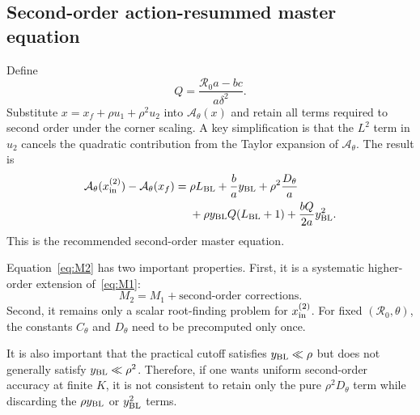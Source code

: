 \documentclass[11pt,a4paper]{article}
\newcommand{\Rzero}{\mathcal R_0}
\newcommand{\Afun}{\mathcal A_\theta}
\newcommand{\BL}{y_{\rm BL}}
\newcommand{\xf}{x_f}
\begin{document}
\subsection{Second-order action-resummed master equation}
Define
\begin{equation}
\label{eq:Q}
Q=\frac{\Rzero a-bc}{a\delta^2}.
\end{equation}
Substitute $x=\xf+\rho u_1+\rho^2u_2$ into $\Afun(x)$ and retain all terms required to second order under the corner scaling. A key simplification is that the $L^2$ term in $u_2$ cancels the quadratic contribution from the Taylor expansion of $\Afun$. The result is
\begin{equation}
\label{eq:M2}
\begin{split}
\Afun(x_{\rm in}^{(2)})-\Afun(\xf)
={}&\rho L_{\rm BL}
+\frac ba\BL
+\rho^2\frac{D_\theta}{a}\\
&+\rho\BL Q(L_{\rm BL}+1)
+\frac{bQ}{2a}\BL^2.
\end{split}
\end{equation}
This is the recommended second-order master equation.

Equation~\eqref{eq:M2} has two important properties. First, it is a systematic higher-order extension of~\eqref{eq:M1}:
\[
M_2=M_1+\text{second-order corrections}.
\]
Second, it remains only a scalar root-finding problem for $x_{\rm in}^{(2)}$. For fixed $(\Rzero,\theta)$, the constants $C_\theta$ and $D_\theta$ need to be precomputed only once.

It is also important that the practical cutoff satisfies $\BL\ll\rho$ but does not generally satisfy $\BL\ll\rho^2$. Therefore, if one wants uniform second-order accuracy at finite $K$, it is not consistent to retain only the pure $\rho^2D_\theta$ term while discarding the $\rho\BL$ or $\BL^2$ terms.
\end{document}
